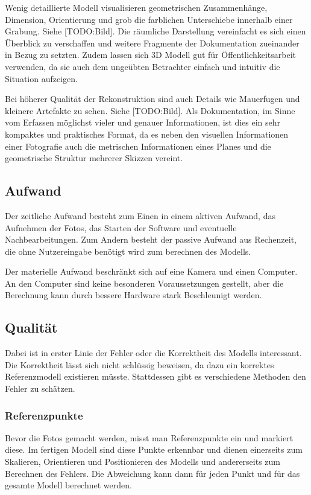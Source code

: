 			Wenig detaillierte Modell visualisieren geometrischen Zusammenhänge, Dimension, Orientierung und grob die farblichen Unterschiebe innerhalb einer Grabung. Siehe [TODO:Bild]. Die räumliche Darstellung vereinfacht es sich einen Überblick zu verschaffen und weitere Fragmente der Dokumentation zueinander in Bezug zu setzten.
			Zudem lassen sich 3D Modell gut für Öffentlichkeitsarbeit verwenden, da sie auch dem ungeübten Betrachter einfach und intuitiv die Situation aufzeigen.
			
			Bei höherer Qualität der Rekonstruktion sind auch Details wie Mauerfugen und kleinere Artefakte zu sehen. Siehe [TODO:Bild]. Als Dokumentation, im Sinne vom Erfassen möglichst vieler und genauer Informationen, ist dies ein sehr kompaktes und praktisches Format, da es neben den visuellen Informationen einer Fotografie auch die metrischen Informationen eines Planes und die geometrische Struktur mehrerer Skizzen vereint. 
			
		\subsection{Aufwand}
			Der zeitliche Aufwand besteht zum Einen in einem aktiven Aufwand, das Aufnehmen der Fotos, das Starten der Software und eventuelle Nachbearbeitungen. Zum Andern besteht der passive Aufwand aus Rechenzeit, die ohne Nutzereingabe benötigt wird zum berechnen des Modells.
			
			Der materielle Aufwand beschränkt sich auf eine Kamera und einen Computer. An den Computer sind keine besonderen Voraussetzungen gestellt, aber die Berechnung kann durch bessere Hardware stark Beschleunigt werden.

		\subsection{Qualität}
			Dabei ist in erster Linie der Fehler oder die Korrektheit des Modells interessant. Die Korrektheit lässt sich nicht schlüssig beweisen, da dazu ein korrektes Referenzmodell existieren müsste.
			Stattdessen gibt es verschiedene Methoden den Fehler zu schätzen.
			
			\subsubsection{Referenzpunkte}
				Bevor die Fotos gemacht werden, misst man Referenzpunkte ein und markiert diese. Im fertigen Modell sind diese Punkte erkennbar und dienen einerseits zum Skalieren, Orientieren und Positionieren des Modells und andererseits zum Berechnen des Fehlers. Die Abweichung kann dann für jeden Punkt und für das gesamte Modell berechnet werden.
				
